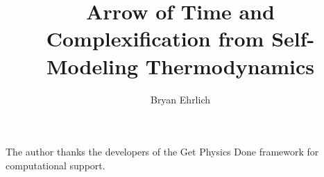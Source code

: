 \documentclass[aps,prd,twocolumn,superscriptaddress,nofootinbib]{revtex4-2}
\begin{document}
\title{Arrow of Time and Complexification from Self-Modeling Thermodynamics}

\author{Bryan Ehrlich}

\begin{abstract}

\end{abstract}

\maketitle









\begin{acknowledgments}
The author thanks the developers of the Get Physics Done framework
for computational support.
\end{acknowledgments}

\appendix




\end{document}
